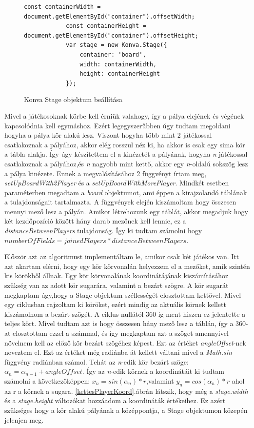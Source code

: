 \documentclass[a4paper,twoside]{article}
\begin{document}
\begin{figure}
	\caption{Konva Stage objektum beállítása}
	\begin{minipage}{\textwidth}
		\begin{lstlisting}[style=javascriptStyle]
			 const containerWidth = document.getElementById("container").offsetWidth;
			const containerHeight = document.getElementById("container").offsetHeight;
			var stage = new Konva.Stage({
				container: 'board',
				width: containerWidth,
				height: containerHeight
			});
		\end{lstlisting}
	\end{minipage}
	
	\label{konvaStage}
\end{figure}
\FloatBarrier

Mivel a játékosoknak körbe kell érniük valahogy, így a pálya elejének és végének kapcsolódnia kell egymáshoz. Ezért legegyszerűbben úgy tudtam megoldani hogyha a pálya kör alakú lesz. Viszont hogyha több mint 2 játékossal csatlakoznak a pályához, akkor elég rosszul néz ki, ha akkor is csak egy sima kör a tábla alakja. Így úgy készítettem el a kinézetét a pályának, hogyha \textit{n} játékossal csatlakoznak a pályához,és \textit{n} nagyobb mint kettő, akkor egy \textit{n}-oldalú sokszög lesz a pálya kinézete. Ennek a megvalósításához 2 függvényt írtam meg, \textit{setUpBoardWith2Player} és a \textit{setUpBoardWithMorePlayer}. Mindkét esetben paraméterben megadtam a \textit{board} objektumot, ami éppen a kirajzolandó táblának a tulajdonságait tartalmazta. A függvények elején kiszámoltam hogy összesen mennyi mező lesz a pályán. Amikor létrehozunk egy táblát, akkor megadjuk hogy két kezdőpozíció között hány darab mezőnek kell lennie, ez a \textit{distanceBetweenPlayers} tulajdonság. Így ki tudtam számolni hogy \(numberOfFields = joinedPlayers * distanceBetweenPlayers\).

Először azt az algoritmust implementáltam le, amikor csak két játékos van. Itt azt akartam elérni, hogy egy kör körvonalán helyezzem el a mezőket, amik szintén kis körökből állnak. Egy kör körvonalának koordinátájának kiszámításához szükség van az adott kör sugarára, valamint a bezárt szögre. A kör sugarát megkaptam úgy,hogy a Stage objektum széllességét elosztottam kettővel. Mivel egy ciklusban rajzoltam ki köröket, ezért mindig az aktuális körnek kellett kiszámolnom  a bezárt szögét. A ciklus nullától 360-ig ment hiszen ez jelentette a teljes kört. Mivel tudtam azt is hogy összesen hány mező lesz a táblán, így a 360-at elosztottam ezzel a számmal, és így megkaptam azt a szöget amennyivel növelnem kell az előző kör bezárt szögéhez képest. Ezt az értéket \textit{angleOffset}-nek neveztem el. Ezt az értéket még radiánba át kellett váltani mivel a \textit{Math.sin} függvény radiánban számol.  Tehát az \textit{n}-edik kör bezárt szöge: \(\alpha_{n} = \alpha_{n-1} + angleOffset\). Így az \textit{n}-edik körnek a koordinátáit ki tudtam számolni a következőképpen: 
\(x_{n} = sin(\alpha_{n})*r\),valamint \(y_{n} = cos(\alpha_{n})*r\) ahol az r a körnek a sugara. \ref{kettesPlayerKoord}.ábrán látszik, hogy még a \textit{stage.width} és a \textit{stage.height} változókat hozzáadom a koordináták értékeihez. Ez azért szükséges hogy a kör alakú pályának a középpontja, a Stage objektumon közepén jelenjen meg. 
\end{document}
